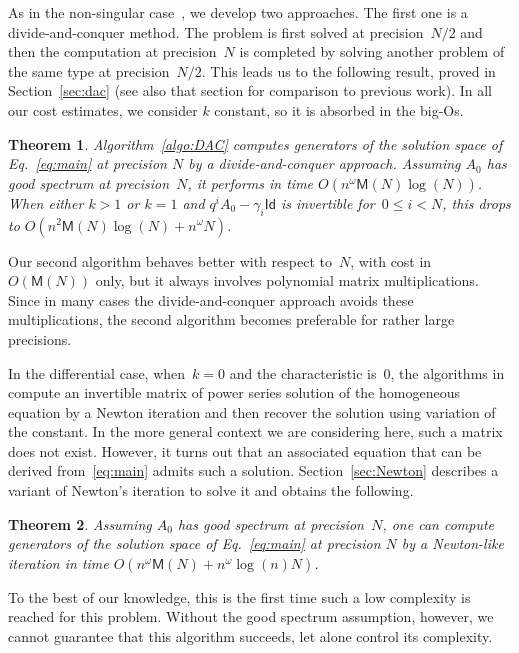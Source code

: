 \documentclass[]{sig-alternate}
\def\M {\ensuremath{\mathsf{M}}}
\def\Id{\ensuremath{\mathsf{Id}}}
\newtheorem{Theo}{Theorem}
\begin{document}
As in the non-singular case~\cite{BoChOlSaScSc07}, we develop two
approaches. The first one is a divide-and-conquer method. The problem
is first solved at precision~$N/2$ and then the computation at
precision~$N$ is completed by solving another problem of the same type
at precision~$N/2$. This leads us to the following result, proved in
Section~\ref{sec:dac} (see also that section for comparison to
previous work). In all our cost estimates, we consider $k$ constant,
so it is absorbed in the big-Os.
\begin{Theo}\label{theo:1}
Algorithm~\ref{algo:DAC} computes generators of the solution space of Eq.~\eqref{eq:main} at precision
	  $N$ by a divide-and-conquer approach.
  Assuming $A_0$ has good spectrum at precision~$N$, it performs
   in time $O(n^\omega \M(N)
  \log(N))$. When either $k>1$ or $k=1$ and $q^iA_0-\gamma_i\Id$ is
  invertible for~$0\le i< N$, this drops to
  $O(n^2\M(N)\log(N)+n^\omega N)$.
\end{Theo}

Our second algorithm behaves better with respect to~$N$, with cost
in~$O(\M(N))$ only, but it always involves polynomial matrix
multiplications. Since in many cases the divide-and-conquer approach
avoids these multiplications, the second algorithm becomes preferable
for rather large precisions.

In the differential case, when~$k=0$ and the characteristic is~0, the
algorithms in~\cite{BoChOlSaScSc07,BrKu78} compute an invertible matrix of power series
solution of the homogeneous equation by a Newton iteration and then
recover the solution using variation of the constant. In the more
general context we are considering here, such a matrix does not
exist. However, it turns out that an associated equation that can be
derived from~\eqref{eq:main} admits such a
solution. Section~\ref{sec:Newton} describes a variant of Newton's
iteration to solve it and obtains the following.
\begin{Theo}\label{theo:2}
  Assuming $A_0$ has good spectrum at precision~$N$, one can compute
  generators of the solution space of Eq.~\eqref{eq:main} at precision
  $N$ by a Newton-like iteration in time $O(n^\omega \M(
N)+n^\omega\log(n)N)$.
\end{Theo}
To the best of our knowledge, this is the first time such a low
complexity is reached for this problem. Without the good spectrum
assumption, however, we cannot guarantee that this algorithm succeeds,
let alone control its complexity.
\end{document}
